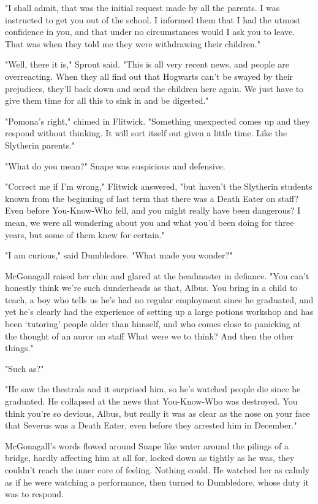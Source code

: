 "I shall admit, that was the initial request made by all the parents. I was instructed to get you out of the school. I informed them that I had the utmost confidence in you, and that under no circumstances would I ask you to leave. That was when they told me they were withdrawing their children."

"Well, there it is," Sprout said. "This is all very recent news, and people are overreacting. When they all find out that Hogwarts can't be swayed by their prejudices, they'll back down and send the children here again. We just have to give them time for all this to sink in and be digested."

"Pomona's right," chimed in Flitwick. "Something unexpected comes up and they respond without thinking. It will sort itself out given a little time. Like the Slytherin parents."

"What do you mean?" Snape was suspicious and defensive.

"Correct me if I'm wrong," Flitwick answered, "but haven't the Slytherin students known from the beginning of last term that there was a Death Eater on staff? Even before You-Know-Who fell, and you might really have been dangerous? I mean, we were all wondering about you and what you'd been doing for three years, but some of them knew for certain."

"I am curious," said Dumbledore. "What made you wonder?"

McGonagall raised her chin and glared at the headmaster in defiance. "You can't honestly think we're such dunderheads as that, Albus. You bring in a child to teach, a boy who tells us he's had no regular employment since he graduated, and yet he's clearly had the experience of setting up a large potions workshop and has been `tutoring' people older than himself, and who comes close to panicking at the thought of an auror on staff{\el} What were we to think? And then the other things."

"Such as?"

"He saw the thestrals and it surprised him, so he's watched people die since he graduated. He collapsed at the news that You-Know-Who was destroyed. You think you're so devious, Albus, but really it was as clear as the nose on your face that Severus was a Death Eater, even before they arrested him in December."

McGonagall's words flowed around Snape like water around the pilings of a bridge, hardly affecting him at all for, locked down as tightly as he was, they couldn't reach the inner core of feeling. Nothing could. He watched her as calmly as if he were watching a performance, then turned to Dumbledore, whose duty it was to respond.

